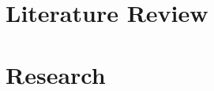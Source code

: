 \documentclass[11pt,a4paper]{report}
\begin{document}
\newpage

\printnoidxglossaries

\newpage



\part{Literature Review}







% 

% 

% 

% 


\part{Research} %











\newpage
\printbibliography[heading=bibintoc]%
\end{document}
